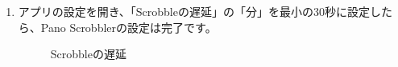 \begin{enumerate}
            \newpage
            \item アプリの設定を開き、「Scrobbleの遅延」の「分」を最小の30秒に設定したら、Pano Scrobblerの設定は完了です。
                \begin{figure}[htbp]
                    \centering
                    \caption{Scrobbleの遅延}
                    \label{img:lastfm10}
                \end{figure}
        \end{enumerate}

    \newpage
